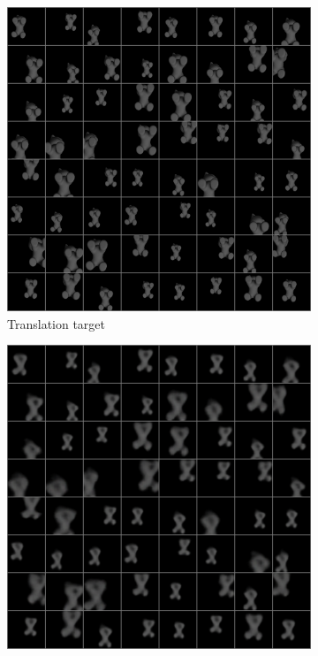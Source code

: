 \documentclass[10pt,a4paper]{article}
\begin{document}
\begin{figure}[!ht]
    \begin{subfigure}{0.3\textwidth}
        \centering	
        \includegraphics[width=\textwidth]{cat_target1.png}
        \caption{Translation target}
        \label{cat_t}
    \end{subfigure}
    \begin{subfigure}{0.3\textwidth}
        \centering	
        \includegraphics[width=\textwidth]{cat_4_output1.png}

\end{subfigure}
\end{figure}
\end{document}
